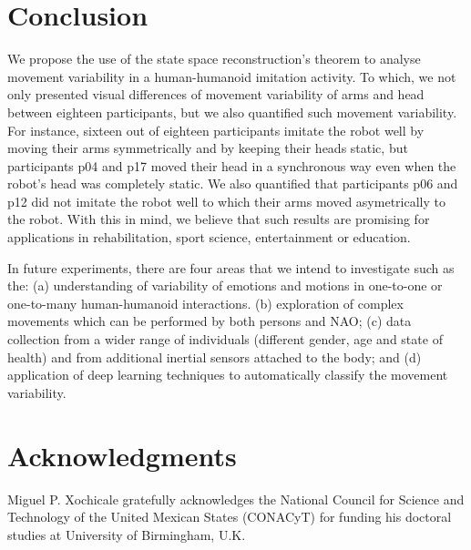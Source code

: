 \documentclass{sigchi}
\begin{document}
\section{Conclusion}
We propose the use of the state space reconstruction's theorem to analyse movement
variability in a human-humanoid imitation activity.
To which, we not only presented visual differences of movement variability
of arms and head between eighteen participants, but we also quantified such
movement variability.
For instance, sixteen out of eighteen participants imitate the robot well
by moving their arms symmetrically and by keeping their heads static, but
participants p04 and p17 moved their head in a synchronous way
even when the robot's head was completely static. We also quantified
that participants p06 and p12 did not imitate the robot well to which
their arms moved asymetrically to the robot. With this in mind, we believe
that such results are promising for applications in rehabilitation,
sport science, entertainment or education.

In future experiments, there are four areas that we intend to investigate
such as the:
(a) understanding of variability of emotions and motions in
one-to-one or one-to-many human-humanoid interactions.
(b) exploration of complex movements which can be performed by both persons and NAO;
(c) data collection from a wider range of individuals
(different gender, age and state of health) and from additional inertial sensors
attached to the body; and
(d) application of deep learning techniques to automatically classify the
movement variability.







\section{Acknowledgments}
Miguel P. Xochicale gratefully acknowledges the National Council for Science
and Technology of the United Mexican States (CONACyT) for funding his doctoral
studies at University of Birmingham, U.K.
\end{document}
